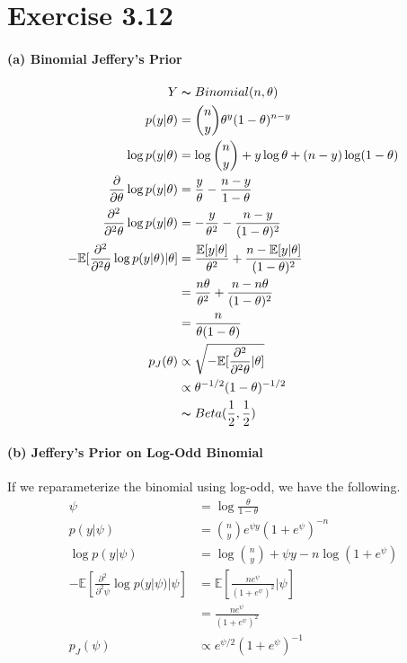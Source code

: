 \documentclass[11pt, letterpaper]{article}
\author{Ryan Tang}
\date{October 7th 2022}
\begin{document}
\maketitle

\section{Exercise 3.12}
\paragraph{(a) Binomial Jeffery's Prior}
\begin{align*}
    Y &\thicksim Binomial(n, \theta) \\
    p(y|\theta) &= {n \choose y} \theta^y (1-\theta)^{n-y} \\
    \log p(y|\theta) &= \log{n \choose y} + y \log\theta + (n-y)\log(1-\theta) \\
    \frac{\partial}{\partial \theta} \log p(y|\theta) &= \frac{y}{\theta} - \frac{n-y}{1-\theta} \\
    \frac{\partial^2}{\partial^2 \theta} \log p(y|\theta) &= -\frac{y}{\theta^2} - \frac{n-y}{(1-\theta)^2} \\
    - \mathbb{E}[\frac{\partial^2}{\partial^2 \theta} \log p(y|\theta)|\theta]
        &= \frac{\mathbb{E}[y|\theta]}{\theta^2} + \frac{n-\mathbb{E}[y|\theta]}{(1-\theta)^2} \\
        &= \frac{n\theta}{\theta^2} + \frac{n-n\theta}{(1-\theta)^2} \\
        &= \frac{n}{\theta(1-\theta)} \\
    p_J(\theta) &\propto \sqrt{- \mathbb{E}[\frac{\partial^2}{\partial^2 \theta}|\theta]} \\
        &\propto \theta^{-1/2} (1-\theta)^{-1/2} \\
        &\thicksim Beta(\frac{1}{2}, \frac{1}{2})
\end{align*}

\paragraph{(b) Jeffery's Prior on Log-Odd Binomial}
If we reparameterize the binomial using log-odd, we have the following.
\begin{align*}
    \psi &= \log\frac{\theta}{1-\theta} \\
    p(y|\psi) &= {n \choose y} e^{\psi y} (1+e^\psi)^{-n} \\
    \log p(y|\psi) &= \log{n \choose y} + \psi y -n \log(1+e^\psi) \\
    -\mathbb{E}[\frac{\partial^2}{\partial^2 \psi} \log p(y|\psi) | \psi]
        &= \mathbb{E}[\frac{n e^\psi}{(1+e^\psi)^2} | \psi] \\
        &= \frac{n e^\psi}{(1+e^\psi)^2} \\
    p_J(\psi) &\propto e^{\psi/2}(1+e^\psi)^{-1}
\end{align*}
\end{document}
